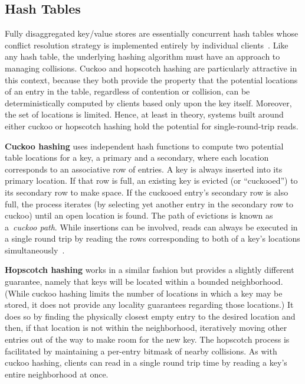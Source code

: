 \documentclass[12pt]{ucsddissertation}
\begin{document}
\subsection{Hash Tables}
\label{sec:hashtables}

Fully disaggregated key/value stores are essentially concurrent hash
tables whose conflict resolution strategy is implemented entirely by
individual clients~\cite{rolex,fusee,race}.  Like any hash table, the
underlying hashing algorithm must have an approach to managing
collisions. Cuckoo and hopscotch hashing are particularly attractive
in this context, because they both provide the property that the
potential locations of an entry in the table, regardless of
contention or collision, can be deterministically computed by clients
based only upon the key itself.  Moreover, the set of locations is
limited.  Hence, at least in theory, systems built around either
cuckoo or hopscotch hashing hold the potential for single-round-trip
reads.


\textbf{Cuckoo hashing} uses independent hash functions to compute two
potential table locations for a key, a primary and a secondary, where
each location corresponds to an associative row of entries.  A key is
always inserted into its primary location.  If that row is full, an
existing key is evicted (or ``cuckooed'') to its secondary row to make
space. If the cuckooed entry's secondary row is also full, the process
iterates (by selecting yet another entry in the secondary row to
cuckoo) until an open location is found. The path of evictions is
known as a~\textit{cuckoo path}.  While insertions can be involved,
reads can always be executed in a single round trip by reading the
rows corresponding to both of a key's locations
simultaneously~\cite{pilaf}.

\textbf{Hopscotch hashing} works in a similar fashion but provides a slightly different guarantee,
namely that keys will be located within a bounded neighborhood.  (While cuckoo hashing limits the
number of locations in which a key may be stored, it does not provide any locality guarantees
regarding those locations.) It does so by finding the physically closest empty entry to the desired
location and then, if that location is not within the neighborhood, iteratively moving other entries
out of the way to make room for the new key.  The hopscotch process is facilitated by maintaining a
per-entry bitmask of nearby collisions.  As with cuckoo hashing, clients can read in a single round
trip time by reading a key's entire neighborhood at once.
\end{document}
